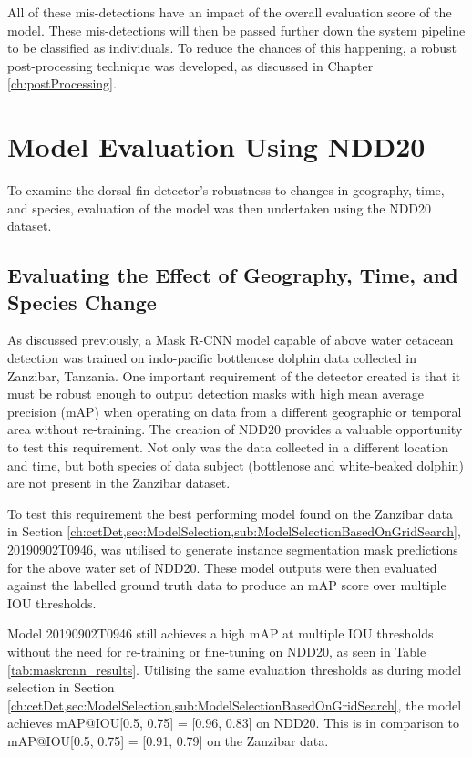 All of these mis-detections have an impact of the overall evaluation score of the model. These mis-detections will then be passed further down the system pipeline to be classified as individuals. To reduce the chances of this happening, a robust post-processing technique was developed, as discussed in Chapter \ref{ch:postProcessing}.

\section{Model Evaluation Using NDD20}\label{ch:cetDet,sec:EvalUsingNDD20}

To examine the dorsal fin detector's robustness to changes in geography, time, and species, evaluation of the model was then undertaken using the NDD20 dataset.

\subsection{Evaluating the Effect of Geography, Time, and Species Change}\label{ch:cetDet,sec:EvalUsingNDD20,subsec:geographyTimeSpeciesChange}

As discussed previously, a Mask R-CNN model capable of above water cetacean detection was trained on indo-pacific bottlenose dolphin data collected in Zanzibar, Tanzania. One important requirement of the detector created is that it must be robust enough to output detection masks with high mean average precision (mAP) when operating on data from a different geographic or temporal area without re-training. The creation of NDD20 provides a valuable opportunity to test this requirement. Not only was the data collected in a different location and time, but both species of data subject (bottlenose and white-beaked dolphin) are not present in the Zanzibar dataset.  

To test this requirement the best performing model found on the Zanzibar data in Section \ref{ch:cetDet,sec:ModelSelection,sub:ModelSelectionBasedOnGridSearch}, 20190902T0946, was utilised to generate instance segmentation mask predictions for the above water set of NDD20. These model outputs were then evaluated against the labelled ground truth data to produce an mAP score over multiple IOU thresholds.

Model 20190902T0946 still achieves a high mAP at multiple IOU thresholds without the need for re-training or fine-tuning on NDD20, as seen in Table \ref{tab:maskrcnn_results}. Utilising the same evaluation thresholds as during model selection in Section \ref{ch:cetDet,sec:ModelSelection,sub:ModelSelectionBasedOnGridSearch}, the model achieves mAP@IOU[0.5, 0.75] = [0.96, 0.83] on NDD20. This is in comparison to mAP@IOU[0.5, 0.75] = [0.91, 0.79] on the Zanzibar data.

